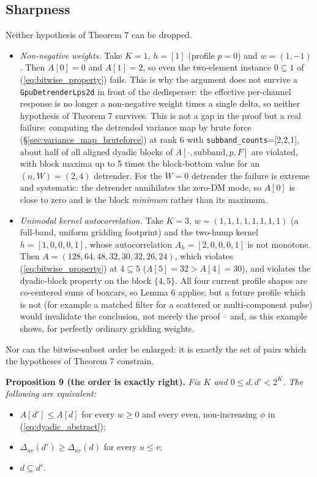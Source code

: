 \documentclass{article}
\numberwithin{equation}{section}   %
\begin{document}
\subsection{Sharpness}
\label{ssec:dyadic_sharpness}

Neither hypothesis of Theorem 7 can be dropped.
\begin{itemize}
\item {\em Non-negative weights.} Take $K=1$, $h=[1]$ (profile $p=0$) and $w = (1,-1)$. Then
$A[0]=0$ and $A[1]=2$, so even the two-element instance $0 \subseteq 1$ of
(\ref{eq:bitwise_property}) fails. This is why the argument does not survive a
{\tt GpuDetrenderLps2d} in front of the dedisperser: the effective per-channel response is no longer
a non-negative weight times a single delta, so neither hypothesis of Theorem 7 survives. This
is not a gap in the proof but a real failure: computing the detrended variance map by brute
force (\S\ref{sec:variance_map_bruteforce}) at rank 6 with {\tt subband\_counts}=[2,2,1],
about half of all aligned dyadic blocks of $A[\cdot,\mbox{subband},p,F]$ are violated, with
block maxima up to 5 times the block-bottom value for an $(n,W)=(2,4)$ detrender. For the
$W=0$ detrender the failure is extreme and systematic: the detrender annihilates the zero-DM
mode, so $A[0]$ is close to zero and is the block {\em minimum} rather than its maximum.
\item {\em Unimodal kernel autocorrelation.} Take $K=3$, $w=(1,1,1,1,1,1,1,1)$ (a full-band,
uniform gridding footprint) and the two-hump kernel $h = [1,0,0,0,1]$, whose autocorrelation
$A_h = [2,0,0,0,1]$ is not monotone. Then $A = (128,64,48,32,30,32,26,24)$, which violates
(\ref{eq:bitwise_property}) at $4 \subseteq 5$ ($A[5] = 32 > A[4] = 30$), and violates the
dyadic-block property on the block $\{4,5\}$. All four current profile shapes are co-centered
sums of boxcars, so Lemma 6 applies; but a future profile which is not (for example a matched
filter for a scattered or multi-component pulse) would invalidate the conclusion, not merely
the proof -- and, as this example shows, for perfectly ordinary gridding weights.
\end{itemize}

Nor can the bitwise-subset order be enlarged: it is exactly the set of pairs which the
hypotheses of Theorem 7 constrain.

\medskip
\par\noindent
{\bf Proposition 9 (the order is exactly right).}
{\em Fix $K$ and $0 \le d, d' < 2^K$. The following are equivalent:}
\begin{itemize}
\item[(i)] $A[d'] \le A[d]$ for every $w \ge 0$ and every even, non-increasing $\phi$ in
(\ref{eq:dyadic_abstract});
\item[(ii)] $\Delta_{uv}(d') \ge \Delta_{uv}(d)$ for every $u \le v$;
\item[(iii)] $d \subseteq d'$.
\end{itemize}
\end{document}
